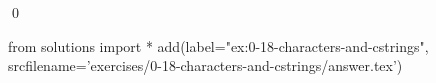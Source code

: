 
\begin{ex}
  \label{ex:0-18-characters-and-cstrings}
  
  \qed
\end{ex}
\begin{python0}
from solutions import *
add(label="ex:0-18-characters-and-cstrings",
    srcfilename='exercises/0-18-characters-and-cstrings/answer.tex')
\end{python0}
